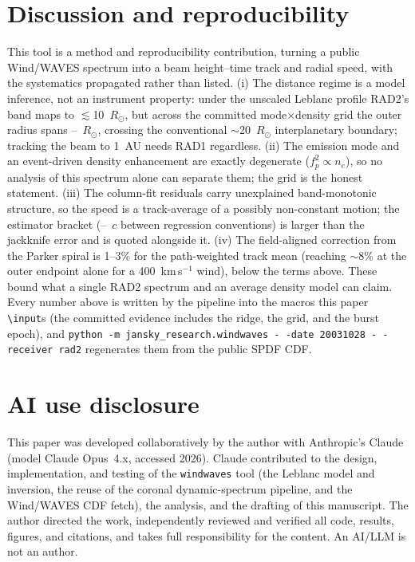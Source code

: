 \documentclass[twocolumn]{aastex631}
\newcommand{\code}[1]{\texttt{#1}}
\begin{document}
\section{Discussion and reproducibility}
This tool is a method and reproducibility contribution, turning a public Wind/WAVES spectrum into a
beam height--time track and radial speed, with the systematics propagated rather than listed.
(i) The distance regime is a model inference, not an instrument property: under the unscaled
Leblanc profile RAD2's band maps to $\lesssim$10~$R_\odot$, but across the committed
mode$\times$density grid the outer radius spans \wwRealGridReachLo--\wwRealGridReachHi~$R_\odot$,
crossing the conventional $\sim$20~$R_\odot$ interplanetary boundary; tracking the beam to 1~AU
needs RAD1 regardless.
(ii) The emission mode and an event-driven density enhancement are exactly degenerate
($f_p^2\propto n_e$), so no analysis of this spectrum alone can separate them; the grid is the
honest statement. (iii) The column-fit residuals carry unexplained band-monotonic structure, so
the speed is a track-average of a possibly non-constant motion; the estimator bracket
(\wwRealSpeedC--\wwRealSpeedCInverse~$c$ between regression conventions) is larger than the
jackknife error and is quoted alongside it. (iv) The field-aligned correction from the Parker
spiral is 1--3\% for the path-weighted track mean (reaching $\sim$8\% at the outer endpoint alone
for a 400~km\,s$^{-1}$ wind), below the terms above. These bound what a single RAD2 spectrum and
an average density model can claim. Every number above is written by the pipeline into the macros
this paper \code{\textbackslash input}s (the committed evidence includes the ridge, the grid, and
the burst epoch), and
\code{python -m jansky\_research.windwaves -\,-date 20031028 -\,-receiver rad2} regenerates them
from the public SPDF CDF.

\section*{AI use disclosure}
This paper was developed collaboratively by the author with Anthropic's Claude
\citep{anthropicclaude} (model Claude Opus~4.x, accessed 2026). Claude contributed to the design,
implementation, and testing of the \code{windwaves} tool (the Leblanc model and inversion, the reuse of
the coronal dynamic-spectrum pipeline, and the Wind/WAVES CDF fetch), the analysis, and the drafting of
this manuscript. The author directed the work, independently reviewed and verified all code, results,
figures, and citations, and takes full responsibility for the content. An AI/LLM is not an author.
\end{document}
